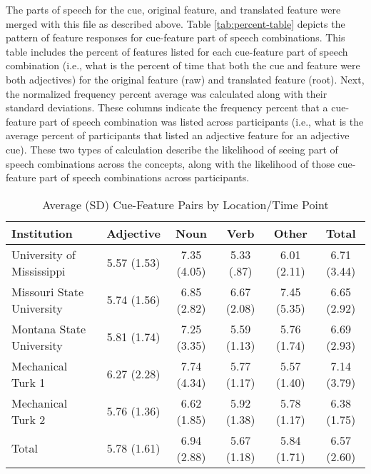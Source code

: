 \documentclass[english,man]{apa6}
\theoremstyle{definition}
\theoremstyle{definition}
\theoremstyle{definition}
\theoremstyle{remark}
\begin{document}
The parts of speech for the cue, original feature, and translated
feature were merged with this file as described above. Table
\ref{tab:percent-table} depicts the pattern of feature responses for
cue-feature part of speech combinations. This table includes the percent
of features listed for each cue-feature part of speech combination
(i.e., what is the percent of time that both the cue and feature were
both adjectives) for the original feature (raw) and translated feature
(root). Next, the normalized frequency percent average was calculated
along with their standard deviations. These columns indicate the
frequency percent that a cue-feature part of speech combination was
listed across participants (i.e., what is the average percent of
participants that listed an adjective feature for an adjective cue).
These two types of calculation describe the likelihood of seeing part of
speech combinations across the concepts, along with the likelihood of
those cue-feature part of speech combinations across participants.

\begin{table}[tbp]
\begin{center}
\begin{threeparttable}
\caption{\label{tab:feature-table}Average (SD) Cue-Feature Pairs by Location/Time Point}
\begin{tabular}{lccccc}
\toprule
Institution & Adjective & Noun & Verb & Other & Total\\
\midrule
University of Mississippi & 5.57 (1.53) & 7.35 (4.05) & 5.33 (.87) & 6.01 (2.11) & 6.71 (3.44)\\
Missouri State University & 5.74 (1.56) & 6.85 (2.82) & 6.67 (2.08) & 7.45 (5.35) & 6.65 (2.92)\\
Montana State University & 5.81 (1.74) & 7.25 (3.35) & 5.59 (1.13) & 5.76 (1.74) & 6.69 (2.93)\\
Mechanical Turk 1 & 6.27 (2.28) & 7.74 (4.34) & 5.77 (1.17) & 5.57 (1.40) & 7.14 (3.79)\\
Mechanical Turk 2 & 5.76 (1.36) & 6.62 (1.85) & 5.92 (1.38) & 5.78 (1.17) & 6.38 (1.75)\\
Total & 5.78 (1.61) & 6.94 (2.88) & 5.67 (1.18) & 5.84 (1.71) & 6.57 (2.60)\\
\bottomrule
\end{tabular}
\end{threeparttable}
\end{center}
\end{table}
\end{document}
